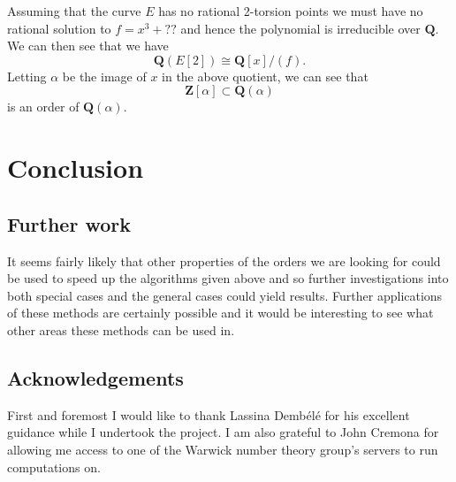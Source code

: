 \documentclass[a4paper,abstracton]{scrreprt}
\theoremstyle{definition}
\newcommand{\QQ}{\mathbf{Q}}
\newcommand{\ZZ}{\mathbf{Z}}
\begin{document}
\minisec{}
Assuming that the curve $E$ has no rational 2-torsion points we must have no rational solution to $f = x^3 + ??$ and hence the polynomial is irreducible over $\QQ$.
We can then see that we have
\[
\QQ(E[2]) \cong \QQ[x]/(f).
\]
Letting $\alpha$ be the image of $x$ in the above quotient, we can see that
\[
\ZZ[\alpha]\subset \QQ(\alpha)
\]
is an order of $\QQ(\alpha)$.



\chapter{Conclusion}


\section{Further work}
It seems fairly likely that other properties of the orders we are looking for could be used to speed up the algorithms given above and so further investigations into both special cases and the general cases could yield results.
Further applications of these methods are certainly possible and it would be interesting to see what other areas these methods can be used in.

\section{Acknowledgements}
First and foremost I would like to thank Lassina Demb\'el\'e for his excellent guidance while I undertook the project.
I am also grateful to John Cremona for allowing me access to one of the Warwick number theory group's servers to run computations on.


 
%

%


\nocite{*}


\end{document}
